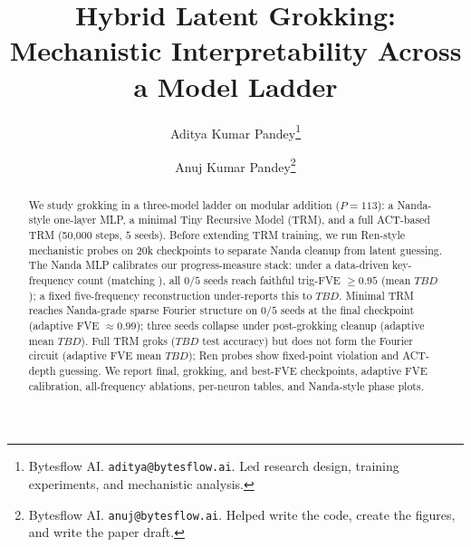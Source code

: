 \documentclass[11pt]{article}
\title{Hybrid Latent Grokking:\\Mechanistic Interpretability Across a Model Ladder}
\author{%
  Aditya Kumar Pandey\thanks{Bytesflow AI. \texttt{aditya@bytesflow.ai}. Led research design, training experiments, and mechanistic analysis.} \and
  Anuj Kumar Pandey\thanks{Bytesflow AI. \texttt{anuj@bytesflow.ai}. Helped write the code, create the figures, and write the paper draft.}%
}
\date{}
\newcommand{\HybridFullAcc}{TBD}
\newcommand{\HybridNandaFVE}{TBD}
\newcommand{\HybridNandaFVEAdaptive}{TBD}
\newcommand{\HybridMinimalFVEAdaptive}{TBD}
\newcommand{\HybridFullFVEAdaptive}{TBD}
\newcommand{\HybridNandaSeedsClean}{0}
\newcommand{\HybridMinimalSeedsClean}{0}
\newcommand{\BMINSeeds}{5}
\begin{document}
\maketitle

\begin{abstract}
We study grokking in a three-model ladder on modular addition ($P{=}113$): a Nanda-style one-layer MLP, a minimal Tiny Recursive Model (TRM), and a full ACT-based TRM (50{,}000 steps, $\BMINSeeds$ seeds).
Before extending TRM training, we run Ren-style mechanistic probes \citep{ren2026reasoning} on 20k checkpoints to separate Nanda cleanup from latent guessing.
The Nanda MLP calibrates our progress-measure stack: under a data-driven key-frequency count (matching \citealp{nanda2023progress}), all $\HybridNandaSeedsClean$/$\BMINSeeds$ seeds reach faithful trig-FVE $\geq 0.95$ (mean $\HybridNandaFVEAdaptive$); a fixed five-frequency reconstruction under-reports this to $\HybridNandaFVE$.
Minimal TRM reaches Nanda-grade sparse Fourier structure on $\HybridMinimalSeedsClean$/$\BMINSeeds$ seeds at the final checkpoint (adaptive FVE $\approx 0.99$); three seeds collapse under post-grokking cleanup (adaptive mean $\HybridMinimalFVEAdaptive$).
Full TRM groks ($\HybridFullAcc$ test accuracy) but does not form the Fourier circuit (adaptive FVE mean $\HybridFullFVEAdaptive$); Ren probes show fixed-point violation and ACT-depth guessing.
We report final, grokking, and best-FVE checkpoints, adaptive FVE calibration, all-frequency ablations, per-neuron tables, and Nanda-style phase plots.
\end{abstract}










\appendix




\end{document}
